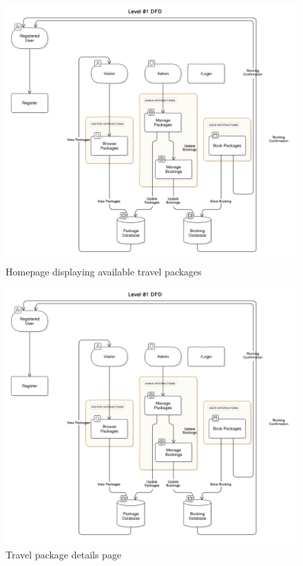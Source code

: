 \documentclass{scrreprt}
\begin{document}
    \begin{figure}[h!]
        \centering
        \includegraphics[width=\textwidth, height=0.4\textheight]{L1.png}
        \caption{Homepage displaying available travel packages}
        \label{fig:homepage}
    \end{figure}
    
    \begin{figure}[h!]
        \centering
        \includegraphics[width=\textwidth, height=0.4\textheight]{L1.png}
        \caption{Travel package details page}
        \label{fig:package_details}
    \end{figure}
\end{document}
